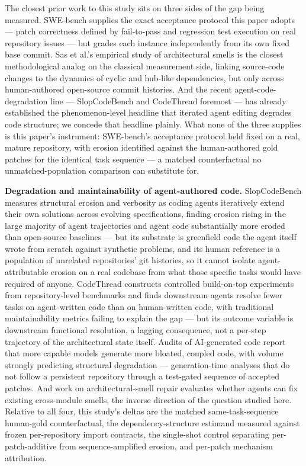 \documentclass[11pt]{article}
\begin{document}
The closest prior work to this study sits on three sides of the gap being measured. SWE-bench supplies the exact acceptance protocol this paper adopts --- patch correctness defined by fail-to-pass and regression test execution on real repository issues --- but grades each instance independently from its own fixed base commit. Sas et al.'s empirical study of architectural smells is the closest methodological analog on the classical measurement side, linking source-code changes to the dynamics of cyclic and hub-like dependencies, but only across human-authored open-source commit histories. And the recent agent-code-degradation line --- SlopCodeBench and CodeThread foremost --- has already established the phenomenon-level headline that iterated agent editing degrades code structure; we concede that headline plainly. What none of the three supplies is this paper's instrument: SWE-bench's acceptance protocol held fixed on a real, mature repository, with erosion identified against the human-authored gold patches for the identical task sequence --- a matched counterfactual no unmatched-population comparison can substitute for.

\textbf{Degradation and maintainability of agent-authored code.} SlopCodeBench measures structural erosion and verbosity as coding agents iteratively extend their own solutions across evolving specifications, finding erosion rising in the large majority of agent trajectories and agent code substantially more eroded than open-source baselines --- but its substrate is greenfield code the agent itself wrote from scratch against synthetic problems, and its human reference is a population of unrelated repositories' git histories, so it cannot isolate agent-attributable erosion on a real codebase from what those specific tasks would have required of anyone. CodeThread constructs controlled build-on-top experiments from repository-level benchmarks and finds downstream agents resolve fewer tasks on agent-written code than on human-written code, with traditional maintainability metrics failing to explain the gap --- but its outcome variable is downstream functional resolution, a lagging consequence, not a per-step trajectory of the architectural state itself. Audits of AI-generated code report that more capable models generate more bloated, coupled code, with volume strongly predicting structural degradation --- generation-time analyses that do not follow a persistent repository through a test-gated sequence of accepted patches. And work on architectural-smell repair evaluates whether agents can fix existing cross-module smells, the inverse direction of the question studied here. Relative to all four, this study's deltas are the matched same-task-sequence human-gold counterfactual, the dependency-structure estimand measured against frozen per-repository import contracts, the single-shot control separating per-patch-additive from sequence-amplified erosion, and per-patch mechanism attribution.
\end{document}
